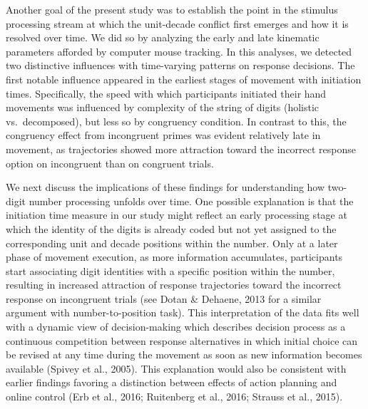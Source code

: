 \documentclass[english,man]{apa6}
\theoremstyle{definition}
\theoremstyle{definition}
\theoremstyle{definition}
\theoremstyle{remark}
\begin{document}
Another goal of the present study was to establish the point in the
stimulus processing stream at which the unit-decade conflict first
emerges and how it is resolved over time. We did so by analyzing the
early and late kinematic parameters afforded by computer mouse tracking.
In this analyses, we detected two distinctive influences with
time-varying patterns on response decisions. The first notable influence
appeared in the earliest stages of movement with initiation times.
Specifically, the speed with which participants initiated their hand
movements was influenced by complexity of the string of digits (holistic
vs.~decomposed), but less so by congruency condition. In contrast to
this, the congruency effect from incongruent primes was evident
relatively late in movement, as trajectories showed more attraction
toward the incorrect response option on incongruent than on congruent
trials.

We next discuss the implications of these findings for understanding how
two-digit number processing unfolds over time. One possible explanation
is that the initiation time measure in our study might reflect an early
processing stage at which the identity of the digits is already coded
but not yet assigned to the corresponding unit and decade positions
within the number. Only at a later phase of movement execution, as more
information accumulates, participants start associating digit identities
with a specific position within the number, resulting in increased
attraction of response trajectories toward the incorrect response on
incongruent trials (see Dotan \& Dehaene, 2013 for a similar argument
with number-to-position task). This interpretation of the data fits well
with a dynamic view of decision-making which describes decision process
as a continuous competition between response alternatives in which
initial choice can be revised at any time during the movement as soon as
new information becomes available (Spivey et al., 2005). This
explanation would also be consistent with earlier findings favoring a
distinction between effects of action planning and online control (Erb
et al., 2016; Ruitenberg et al., 2016; Strauss et al., 2015).
\end{document}
